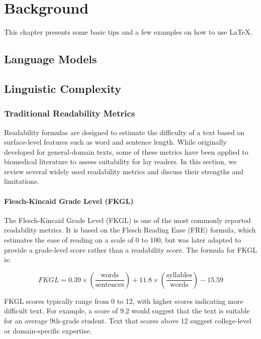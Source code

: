 \chapter{Background}
\label{c2}

This chapter presents some basic tips and a few examples on how to use \LaTeX.


\section{Language Models}
\label{c2:s:language-models}

\section{Linguistic Complexity}
\label{c2:s:linguistic-complexity}

\subsection{Traditional Readability Metrics}

Readability formulas are designed to estimate the difficulty of a text based on surface-level features such as word and sentence length. 
While originally developed for general-domain texts, some of these metrics have been applied to biomedical literature to assess suitability for lay readers. 
In this section, we review several widely used readability metrics and discuss their strengths and limitations.

\subsubsection{Flesch-Kincaid Grade Level (FKGL)}

The Flesch-Kincaid Grade Level (FKGL) is one of the most commonly reported readability metrics. It is based on the Flesch Reading Ease (FRE) formula, which estimates the ease of reading on a scale of 0 to 100, but was later adapted to provide a grade-level score rather than a readability score. 
The formula for FKGL is:

$$FKGL = 0.39 \times \left(\frac{\text{words}}{\text{sentences}}\right) + 11.8 \times \left(\frac{\text{syllables}}{\text{words}}\right) - 15.59$$

FKGL scores typically range from 0 to 12, with higher scores indicating more difficult text. For example, a score of 9.2 would suggest that the text is suitable for an average 9th-grade student. 
Text that scores above 12 suggest college-level or domain-specific expertise. 

